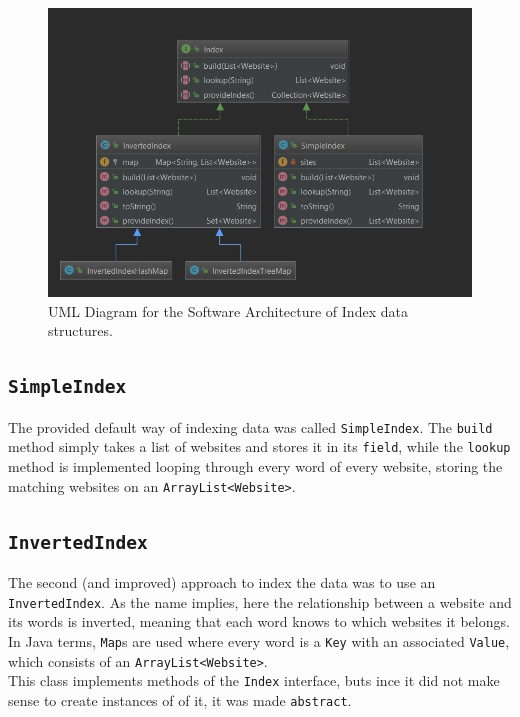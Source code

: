 \begin{figure}[!h]
    \centering
    \includegraphics[width=\textwidth]{figures/Diagram_InvertedIndices}
    \caption{UML Diagram for the Software Architecture of Index data structures.}
    \label{fig:Index:uml}
\end{figure}

\subsection{{\tt SimpleIndex}}
The provided default way of indexing data was called {\tt SimpleIndex}. The {\tt build} method simply takes a list of websites and stores it in its {\tt field}, while the {\tt lookup} method is implemented looping through every word of every website, storing the matching websites on an {\tt ArrayList<Website>}.\\

\subsection{{\tt InvertedIndex}}
The second (and improved) approach to index the data was to use an {\tt InvertedIndex}. As the name implies, here the relationship between a website and its words is inverted, meaning that each word knows to which websites it belongs. In Java terms, {\tt Map}s are used where every word is a {\tt Key} with an associated {\tt Value}, which consists of an {\tt ArrayList<Website>}.\\
This class implements methods of the {\tt Index} interface, buts ince it did not make sense to create instances of of it, it was made {\tt abstract}.


